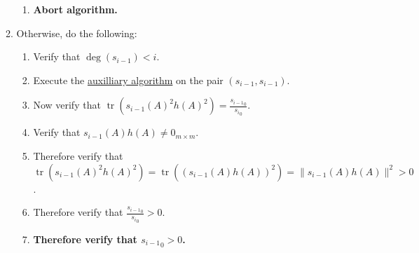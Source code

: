 \documentclass[twocolumn]{article}
\DeclareMathOperator{\tr}{tr}
\begin{document}
\begin{enumerate}
\begin{enumerate}
\begin{enumerate}
						\item \textbf{Abort algorithm.}
					\end{enumerate}
					\item Otherwise, do the following:
					\begin{enumerate}
						\item Verify that $\deg(s_{i-1})<i$.
						\item Execute the \hyperref[sec:algorithm 46 auxilliary algorithm]{auxilliary algorithm} on the pair $(s_{i-1}, s_{i-1})$.
						\item Now verify that $\tr(s_{i-1}(A)^2h(A)^2)=\frac{{s_{i-1}}_0}{{s_i}_0}$.
						\item Verify that $s_{i-1}(A)h(A)\ne 0_{m\times m}$.
						\item Therefore verify that $\tr(s_{i-1}(A)^2h(A)^2)=\tr((s_{i-1}(A)h(A))^2)=\lVert s_{i-1}(A)h(A)\rVert^2>0$.
						\item Therefore verify that $\frac{{s_{i-1}}_0}{{s_i}_0}>0$.
						\item \textbf{Therefore verify that ${s_{i-1}}_0>0$.}
					\end{enumerate}
				\end{enumerate}
			\end{enumerate}
\end{document}
